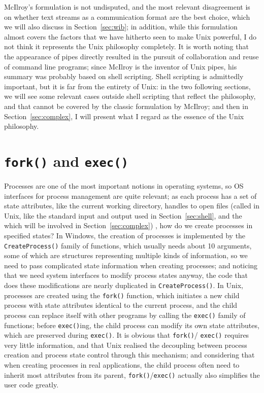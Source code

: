 McIlroy's formulation is not undisputed, and the most relevant disagreement is
on whether text streams as a communication format are the best choice, which we
will also discuss in Section~\ref{sec:wib}; in addition, while this formulation
almost covers the factors that we have hitherto seen to make Unix powerful,
I do not think it represents the Unix philosophy completely.  It is worth
noting that the appearance of pipes directly resulted in the pursuit of
collaboration and reuse of command line programs;
since McIlroy is the inventor of Unix pipes, his summary was probably
based on shell scripting.  Shell scripting is admittedly important,
but it is far from the entirety of Unix: in the two following sections,
we will see some relevant cases outside shell scripting that reflect the
philosophy, and that cannot be covered by the classic formulation by
McIlroy; and then in Section~\ref{sec:complex}, I will present
what I regard as the essence of the Unix philosophy.

\section{\texttt{fork()} and \texttt{exec()}}\label{sec:exec}

Processes are one of the most important notions in operating systems, so OS
interfaces for process management are quite relevant; as each process has a
set of state attributes, like the current working directory, handles to open
files (called  in Unix, like the standard input and
output used in Section~\ref{sec:shell}, and the 
which will be involved in Section~\ref{sec:complex}) \etc, how do we create
processes in specified states?  In Windows, the creation of processes is
implemented by the \verb|CreateProcess()| family of functions, which usually
needs about 10 arguments, some of which are structures representing multiple
kinds of information, so we need to pass complicated state information when
creating processes; and noticing that we need system interfaces to modify
process states anyway, the code that does these modifications are nearly
duplicated in \verb|CreateProcess()|.  In Unix, processes are created using
the \verb|fork()| function, which initiates a new child process with state
attributes identical to the current process, and the child process can replace
itself with other programs by calling the \verb|exec()| family of functions;
before \verb|exec()|ing, the child process can modify its own state attributes,
which are preserved during \verb|exec()|.  It is obvious that \verb|fork()|/%
\verb|exec()| requires very little information, and that Unix realised the
decoupling between process creation and process state control through this
mechanism; and considering that when creating processes in real applications,
the child process often need to inherit most attributes from its parent,
\verb|fork()|/\verb|exec()| actually also simplifies the user code greatly.

